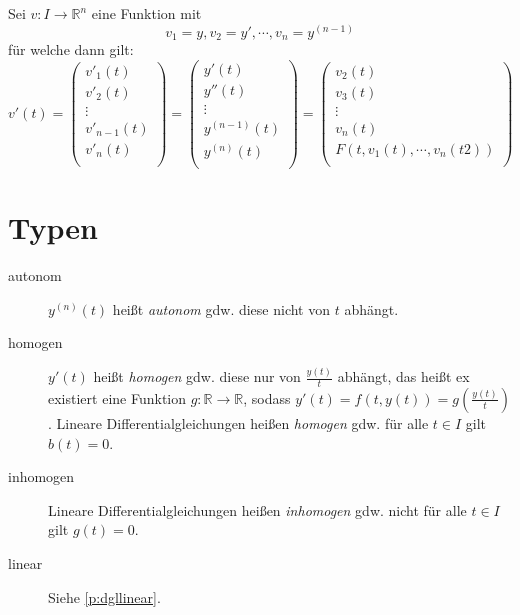 	Sei $ v : I \rightarrow \mathbb{R} ^ n $ eine Funktion mit \[ v _ 1 = y, v _ 2 = y', \cdots, v _ n = y ^ {( n - 1 )} \] für welche dann gilt:
	\begin{equation*}
		v'(t) =
		\begin{pmatrix}
			v' _ 1 (t)         \\
			v' _ 2 (t)         \\
			\vdots             \\
			v' _ { n - 1 } (t) \\
			v' _ n (t)         \\
		\end{pmatrix}
		=
		\begin{pmatrix}
			y'(t)             \\
			y''(t)            \\
			\vdots            \\
			y ^ {(n - 1)} (t) \\
			y ^ {(n)} (t)     \\
		\end{pmatrix}
		=
		\begin{pmatrix}
			v _ 2 (t)                           \\
			v _ 3 (t)                           \\
			\vdots                              \\
			v _ n (t)                           \\
			F(t, v _ 1 (t), \cdots, v _ n (t2)) \\
		\end{pmatrix}
	\end{equation*}


\section{Typen}
	\begin{description}
		\item[autonom] $ y ^ {(n)} (t) $ heißt \textit{autonom} gdw. diese nicht von $ t $ abhängt.
		\item[homogen] $ y'(t) $ heißt \textit{homogen} gdw. diese nur von $ \frac{y(t)}{t} $ abhängt, das heißt ex existiert eine Funktion $ g : \mathbb{R} \rightarrow \mathbb{R} $, sodass $ y'(t) = f(t, y(t)) = g(\frac{y(t)}{t}) $. Lineare Differentialgleichungen heißen \textit{homogen} gdw. für alle $ t \in I $ gilt $ b(t) = 0 $.
		\item[inhomogen] Lineare Differentialgleichungen heißen \textit{inhomogen} gdw. nicht für alle $ t \in I $ gilt $ g(t) = 0 $.
		\item[linear] Siehe \ref{p:dgllinear}.
	\end{description}

